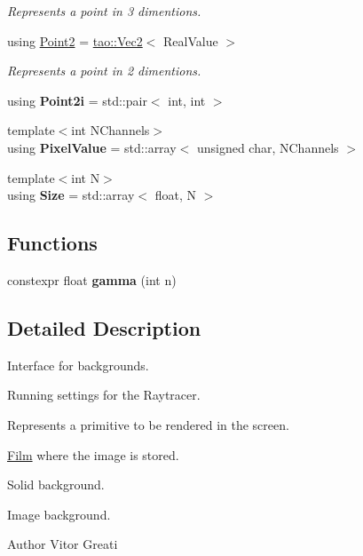 \begin{DoxyCompactItemize}
\begin{DoxyCompactList}\small\item\em Represents a point in 3 dimentions. \end{DoxyCompactList}\item 
\mbox{\label{namespaceomg_a18e42fb7bbc4159e9137145b866ec578}} 
using \mbox{\hyperlink{namespaceomg_a18e42fb7bbc4159e9137145b866ec578}{Point2}} = \mbox{\hyperlink{namespacetao_a7c689316b82c94e7228f42ac874a548b}{tao\+::\+Vec2}}$<$ Real\+Value $>$
\begin{DoxyCompactList}\small\item\em Represents a point in 2 dimentions. \end{DoxyCompactList}\item 
\mbox{\label{namespaceomg_a3de4fc5981be4c324c9cf84a4f845f8b}} 
using {\bfseries Point2i} = std\+::pair$<$ int, int $>$
\item 
\mbox{\label{namespaceomg_adfd06c82d92702d5d6411fb77c25af04}} 
{\footnotesize template$<$int N\+Channels$>$ }\\using {\bfseries Pixel\+Value} = std\+::array$<$ unsigned char, N\+Channels $>$
\item 
\mbox{\label{namespaceomg_a3f437d3821402dd1b1d1ddb5c73f6597}} 
{\footnotesize template$<$int N$>$ }\\using {\bfseries Size} = std\+::array$<$ float, N $>$
\end{DoxyCompactItemize}
\subsection*{Functions}
\begin{DoxyCompactItemize}
\item 
\mbox{\label{namespaceomg_a1d1cf9f26654c270189c08d6e4aedf0a}} 
constexpr float {\bfseries gamma} (int n)
\end{DoxyCompactItemize}


\subsection{Detailed Description}
Interface for backgrounds. 

Running settings for the Raytracer.

Represents a primitive to be rendered in the screen.

\mbox{\hyperlink{classomg_1_1_film}{Film}} where the image is stored.

Solid background.

Image background.

\begin{DoxyAuthor}{Author}
Vitor Greati 
\end{DoxyAuthor}
